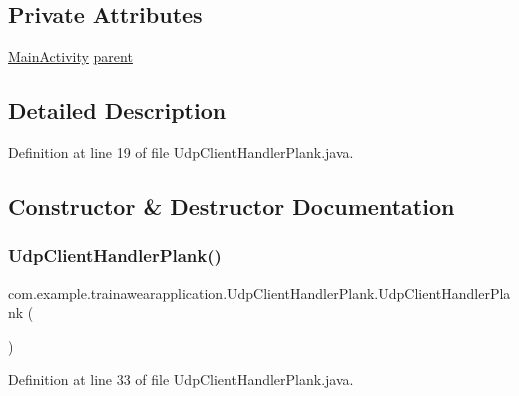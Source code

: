 \subsection*{Private Attributes}
\begin{DoxyCompactItemize}
\item 
\mbox{\hyperlink{classcom_1_1example_1_1trainawearapplication_1_1_main_activity}{Main\+Activity}} \mbox{\hyperlink{classcom_1_1example_1_1trainawearapplication_1_1_udp_client_handler_plank_a4ae127059889ca5270670220bb58b613}{parent}}
\end{DoxyCompactItemize}


\subsection{Detailed Description}


Definition at line 19 of file Udp\+Client\+Handler\+Plank.\+java.



\subsection{Constructor \& Destructor Documentation}
\mbox{\label{classcom_1_1example_1_1trainawearapplication_1_1_udp_client_handler_plank_a648a0fa42206709b739c8b754aa178dd}} 
\subsubsection{\texorpdfstring{UdpClientHandlerPlank()}{UdpClientHandlerPlank()}}
{\footnotesize\ttfamily com.\+example.\+trainawearapplication.\+Udp\+Client\+Handler\+Plank.\+Udp\+Client\+Handler\+Plank (\begin{DoxyParamCaption}{ }\end{DoxyParamCaption})\hspace{0.3cm}{\ttfamily [inline]}}



Definition at line 33 of file Udp\+Client\+Handler\+Plank.\+java.


\begin{DoxyCode}{0}

\end{DoxyCode}


